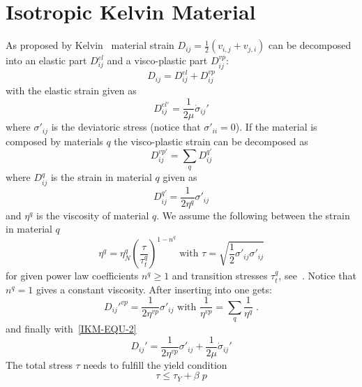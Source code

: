 \section{Isotropic Kelvin Material \label{IKM}}
As proposed by Kelvin~\cite{Muhlhaus2005} material strain
$D_{ij}=\frac{1}{2}(v_{i,j}+v_{j,i})$ can be decomposed into an elastic part
$D_{ij}^{el}$ and a visco-plastic part $D_{ij}^{vp}$:
\begin{equation}\label{IKM-EQU-2}
D_{ij}=D_{ij}^{el}+D_{ij}^{vp}
\end{equation}
with the elastic strain given as
\begin{equation}\label{IKM-EQU-3}
D_{ij}^{el'}=\frac{1}{2 \mu} \dot{\sigma}_{ij}'
\end{equation}
where $\sigma'_{ij}$ is the deviatoric stress (notice that $\sigma'_{ii}=0$).
If the material is composed by materials $q$ the visco-plastic strain can be
decomposed as
\begin{equation}\label{IKM-EQU-4}
D_{ij}^{vp'}=\sum_{q} D_{ij}^{q'} 
\end{equation}
where $D_{ij}^{q}$ is the strain in material $q$ given as
\begin{equation}\label{IKM-EQU-5}
D_{ij}^{q'}=\frac{1}{2 \eta^{q}} \sigma'_{ij} 
\end{equation}
and $\eta^{q}$ is the viscosity of material $q$.
We assume the following between the strain in material $q$
\begin{equation}\label{IKM-EQU-5b}
\eta^{q}=\eta^{q}_{N} \left(\frac{\tau}{\tau_{t}^q}\right)^{1-n^{q}}
\mbox{ with } \tau=\sqrt{\frac{1}{2}\sigma'_{ij} \sigma'_{ij}}
\end{equation}
for given power law coefficients $n^{q}\ge1$ and transition stresses
$\tau_{t}^q$, see~\cite{Muhlhaus2005}.
Notice that $n^{q}=1$ gives a constant viscosity.
After inserting  into  one gets:
\begin{equation}\label{IKM-EQU-6}
D_{ij}'^{vp}=\frac{1}{2 \eta^{vp}} \sigma'_{ij} \mbox{ with } \frac{1}{\eta^{vp}} = \sum_{q} \frac{1}{\eta^{q}} \;.
\end{equation}
and finally with~\ref{IKM-EQU-2}
\begin{equation}\label{IKM-EQU-2bb}
D_{ij}'=\frac{1}{2 \eta^{vp}} \sigma'_{ij}+\frac{1}{2 \mu} \dot{\sigma}_{ij}'
\end{equation}
The total stress $\tau$ needs to fulfill the yield condition
\begin{equation}\label{IKM-EQU-8c}
\tau \le \tau_{Y} + \beta \; p
\end{equation}
